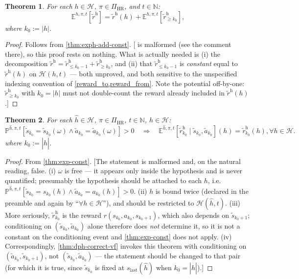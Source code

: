 \documentclass[letterpaper]{article}
\theoremstyle{plain}
\newtheorem{theorem}{Theorem}[subsection]
\theoremstyle{definition}
\theoremstyle{remark}
\newcommand{\Nats}{\mathbb{N}}
\newcommand{\E}{\mathbb{E}}
\newcommand{\PP}{\mathbb{P}}
\newcommand{\PiHR}{\Pi_{\mathrm{HR}}}
\newcommand{\rew}{\tilde{r}^{\mathrm{h}}}
\newcommand{\cc}[1]{\textcolor{ccolor}{[#1]}}
\newcommand{\lean}[1]{\textcolor{blue}{(\emph{LEAN}: \texttt{#1})}}
\begin{document}
\begin{theorem}\label{thm:sum-rew-eq-sum-rew-rg}
For each $h\in \mathcal{H}$, $\pi \in \PiHR$, and $t\in \Nats$:
\[
\E^{h, \pi, t} \left[  \rew \right]
=
\rew(h) + \E^{h, \pi, t} \left[ \rew_{\ge k_0} \right],
\]
where $k_0:=|h|$.
\end{theorem}
\begin{proof}
Follows from \cref{thm:exph-add-const}.
\cc{ is malformed (see the comment there), so this proof rests on nothing. What is actually needed is (i) the decomposition $\rew = \rew_{\le k_0-1} + \rew_{\ge k_0}$, and (ii) that $\rew_{\le k_0-1}$ is \emph{constant} equal to $\rew(h)$ on $\mathcal{H}(h,t)$ --- both unproved, and both sensitive to the unspecified indexing convention of \cref{reward_to,reward_from}. Note the potential off-by-one: $\rew_{\ge k_0}$ with $k_0=|h|$ must not double-count the reward already included in $\rew(h)$.}
\end{proof}

\begin{theorem}\label{thm:sum-rew-cnd}
For each $\hat{h}\in \mathcal{H}$, $\pi \in \PiHR$, $t\in \Nats$, $h\in \mathcal{H}$:
\begin{equation*}
  \PP^{\hat{h},\pi,t}[\tilde{s}_{k_0}=\tilde{s}_{k_0}(\omega) \wedge \tilde{a}_{k_0} = \tilde{a}_{k_0}(\omega) ] > 0
\quad\Rightarrow \quad
  \E^{\hat{h}, \pi, t} \left[ \rew_{k_0} \mid  \tilde{s}_{k_0}, \tilde{a}_{k_0}\right](h) = \rew_{k_0}(h), \forall h \in \mathcal{H}.
\end{equation*}
where $k_0:= |\hat{h}|$.
\end{theorem}
\begin{proof}
 From \cref{thm:exp-const}. 
\cc{The statement is malformed and, on the natural reading, false. (i) $\omega$ is free --- it appears only inside the hypothesis and is never quantified; presumably the hypothesis should be attached to each $h$, i.e.\ $\PP^{\hat h,\pi,t}[\tilde{s}_{k_0}=s_{k_0}(h)\wedge \tilde{a}_{k_0}=a_{k_0}(h)]>0$. (ii) $h$ is bound twice (declared in the preamble and again by ``$\forall h\in\mathcal{H}$''), and should be restricted to $\mathcal{H}(\hat{h},t)$. (iii) More seriously, $\rew_{k_0}$ is the reward $r(s_{k_0},a_{k_0},s_{k_0+1})$, which also depends on $\tilde{s}_{k_0+1}$; conditioning on $(\tilde{s}_{k_0},\tilde{a}_{k_0})$ alone therefore does \emph{not} determine it, so it is not a constant on the conditioning event and \cref{thm:exp-const} does not apply. (iv) Correspondingly, \cref{thm:dph-correct-vf} invokes this theorem with conditioning on $(\tilde{a}_{k_0},\tilde{s}_{k_0+1})$, not $(\tilde{s}_{k_0},\tilde{a}_{k_0})$ --- the statement should be changed to that pair (for which it is true, since $\tilde{s}_{k_0}$ is fixed at $s_{\mathrm{last}}(\hat{h})$ when $k_0=|\hat{h}|$).}
\end{proof}
\end{document}
